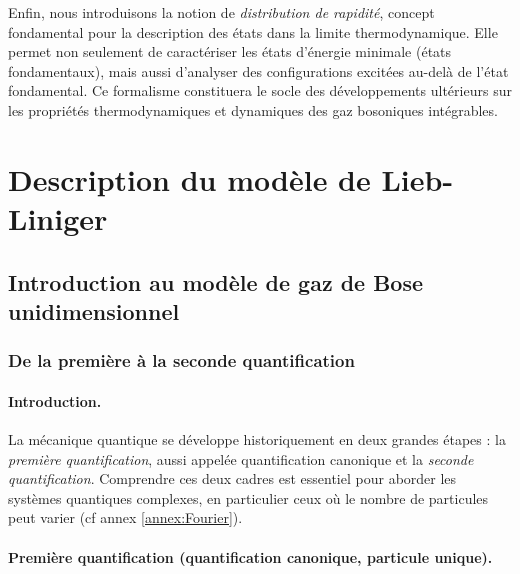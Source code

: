 \medskip


Enfin, nous introduisons la notion de \emph{distribution de rapidité}, concept fondamental pour la description des états dans la limite thermodynamique. Elle permet non seulement de caractériser les états d’énergie minimale (états fondamentaux), mais aussi d’analyser des configurations excitées au-delà de l’état fondamental. Ce formalisme constituera le socle des développements ultérieurs sur les propriétés thermodynamiques et dynamiques des gaz bosoniques intégrables.


\section{Description du modèle de Lieb-Liniger}

\subsection{Introduction au modèle de gaz de Bose unidimensionnel}%

\subsubsection{De la première à la seconde quantification}

\paragraph{Introduction.}

La mécanique quantique se développe historiquement en deux grandes étapes : la \emph{première quantification}, aussi appelée quantification canonique et la \emph{seconde quantification}. Comprendre ces deux cadres est essentiel pour aborder les systèmes quantiques complexes, en particulier ceux où le nombre de particules peut varier (cf annex \ref{annex:Fourier}).




\paragraph{Première quantification (quantification canonique, particule unique).}

